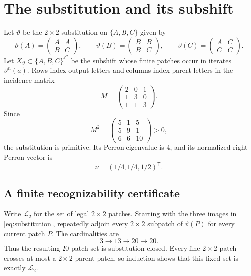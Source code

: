 \documentclass[11pt,a4paper]{amsart}
\theoremstyle{definition}
\theoremstyle{remark}
\newcommand{\Z}{\mathbb Z}
\newcommand{\cL}{\mathcal L}
\begin{document}
\section{The substitution and its subshift}

Let $\vartheta$ be the $2\times2$ substitution on $\{A,B,C\}$ given by
\begin{equation}\label{eq:substitution}
 \vartheta(A)=\begin{pmatrix}A&A\\B&C\end{pmatrix},\qquad
 \vartheta(B)=\begin{pmatrix}B&B\\B&C\end{pmatrix},\qquad
 \vartheta(C)=\begin{pmatrix}A&C\\C&C\end{pmatrix}.
\end{equation}
Let $X_\vartheta\subset\{A,B,C\}^{\Z^2}$ be the subshift whose finite patches
occur in iterates $\vartheta^n(a)$.  Rows index output letters and columns
index parent letters in the incidence matrix
\begin{equation}\label{eq:matrix}
 M=\begin{pmatrix}
 2&0&1\\
 1&3&0\\
 1&1&3
 \end{pmatrix}.
\end{equation}
Since
\[
 M^2=\begin{pmatrix}5&1&5\\5&9&1\\6&6&10\end{pmatrix}>0,
\]
the substitution is primitive.  Its Perron eigenvalue is $4$, and its
normalized right Perron vector is
\begin{equation}\label{eq:frequencies}
 \nu=(1/4,1/4,1/2)^{\mathsf T}.
\end{equation}

\subsection{A finite recognizability certificate}

Write $\cL_2$ for the set of legal $2\times2$ patches.  Starting with the
three images in \eqref{eq:substitution}, repeatedly adjoin every $2\times2$
subpatch of $\vartheta(P)$ for every current patch $P$.  The cardinalities are
\[
 3\longrightarrow13\longrightarrow20\longrightarrow20.
\]
Thus the resulting $20$-patch set is substitution-closed.  Every fine
$2\times2$ patch crosses at most a $2\times2$ parent patch, so induction shows
that this fixed set is exactly $\cL_2$.
\end{document}

